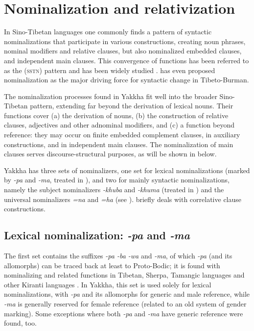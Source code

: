 
\chapter{Nominalization and relativization}\label{ch-nmlz}

In Sino-Tibetan languages one commonly finds a pattern of syntactic nominalizations that participate in various constructions, creating noun phrases, nominal modifiers and relative clauses, but also nominalized embedded clauses,  and independent main clauses. This convergence of functions has been referred to as the  (\textsc{sstn}) pattern \citep[271]{Bickel1999Nominalization} and has been widely studied \citep{Matisoff1972Lahu, DeLancey1989Relativization, Genetti1992Semantic,  Genettietal2008_Nominalization, Saxena1992_Finite, Ebert1994The-structure, DeLancey1999Relativization, Bickel1999Nominalization, Watters2002A-grammar, Noonan2008_Nominalization, Doornenbal2008_Nominalization}. \citet{DeLancey2011_Finite} has even proposed nominalization as the major driving force for syntactic change in Tibeto-Burman. 
 
The nominalization processes found in Yakkha fit well into the broader Sino-Tibetan pattern, extending far beyond the derivation of lexical nouns. Their functions cover (a) the derivation of nouns, (b) the construction of relative clauses, adjectives and other adnominal modifiers, and (c) a function beyond  reference: they may occur on finite embedded complement clauses, in auxiliary constructions, and  in independent main clauses. The nominalization of  main clauses serves discourse-structural purposes, as will be shown in  below.

Yakkha has three sets of nominalizers, one set for lexical nominalizations (marked by \emph{-pa} and \emph{-ma}, treated in ), and two for mainly syntactic nominalizations, namely the subject nominalizers \emph{-khuba} and \emph{-khuma} (treated in ) and the universal nominalizers \emph{=na} and \emph{=ha} (see ).  briefly  deals with correlative clause constructions.


\section{Lexical nominalization: \emph{-pa} and \emph{-ma}}\label{nmlz-pa}

The first set contains the  suffixes \emph{-pa \ti -ba \ti -wa} and \emph{-ma}, of which \emph{-pa} (and its allomorphs) can be traced back at least to Proto-Bodic; it is found with nominalizing and related functions in Tibetan,  Sherpa,  Tamangic languages and other Kiranti languages \citep{DeLancey2002_Relativization, DeLancey2011_Finite, Genetti1992Semantic}. In Yakkha, this set is used solely for lexical nominalizations, with \emph{-pa} and its allomorphs for generic and male reference, while \emph{-ma} is generally reserved for female reference (related to an old system of gender marking). Some exceptions where both \emph{-pa} and \emph{-ma} have generic reference were found, too. 

